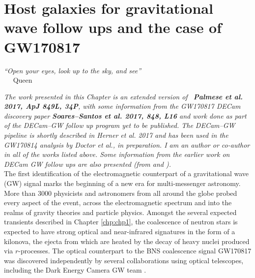 \chapter{Host galaxies for gravitational wave follow ups and the case of GW170817}\label{chp:chp3}

\begin{flushright}
  {\em ``Open your eyes, look up to the sky, and see''}\\
\ \
\normalsize
{Queen}  
\end{flushright}

\noindent \emph{The work presented in this Chapter is an extended version of ~{\bf Palmese et al. 2017, ApJ 849L, 34P}, with some information from the GW170817 DECam discovery paper {\bf Soares--Santos et al. 2017, 848, L16} and work done as part of the DECam--GW follow up program yet to be published. The DECam--GW pipeline is shortly described in Herner et al. 2017 and has been used in the GW170814 analysis by Doctor et al., in preparation. I am an author or co-author in all of the works listed above. Some information from the earlier work on DECam GW follow ups are also presented (from \citealt{marcelle16} and \citealt{Cowperthwaite16}). }\\

\noindent The first identification of the electromagnetic counterpart \citep{MMApaper} of a gravitational wave (GW) signal \citep{ligobns} marks the beginning of a new era for multi-messenger astronomy. More than 3000 physicists and astronomers from all around the globe probed every aspect of the event, across the electromagnetic spectrum and into the realms of gravity theories and particle physics. Amongst the several expected transients described in Chapter \ref{chp:chp1}, the coalescence of neutron stars is expected to have strong optical and near-infrared signatures in the form of a kilonova, the ejecta from which are heated by the decay of heavy nuclei produced via $r$-processes. The optical counterpart to the BNS coalescence signal GW170817 was discovered independently by several collaborations using optical telescopes, including the Dark Energy Camera GW team \citep{marcelle17}. 

